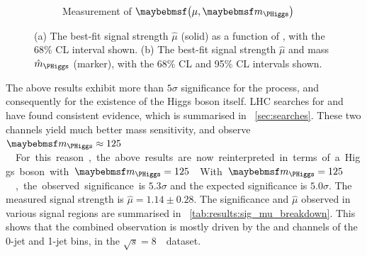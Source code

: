\begin{figure}[t]
\begin{subfigure}[b]{0.495\textwidth}
		\caption{Measurement of $\parenths{\mu, \mH}$}
		\label{fig:results:mu_mH}
	\end{subfigure}
	\caption{(a) The best-fit signal strength $\hat{\mu}$ (solid) as a function of \mH, with 
	the 68\% CL interval shown. (b) The best-fit signal strength $\hat{\mu}$ and mass 
	$\hat{m}_{\PHiggs}$ (marker), with the 68\% CL and 95\% CL intervals shown.}
\end{figure}

The above results exhibit more than $5\sigma$ significance for the \ggHWWlvlv process, and 
consequently for the existence of the Higgs boson itself. LHC searches for 
\HepProcess{\PHiggs \HepTo \Pphoton\Pphoton} and \HepProcess{\PHiggs \HepTo \PZ\PZ} have 
found consistent evidence, which is summarised in \Section~\ref{sec:searches}. These two 
channels yield much better mass sensitivity, and observe \unit{$\mH \approx 125$}{\GeV}. 
For this reason, the above results are now reinterpreted in terms of a Higgs boson with 
\unit{$\mH = 125$}{\GeV}.

With \unit{$\mH = 125$}{\GeV}, the observed significance is $5.3\sigma$ and the expected 
significance is $5.0\sigma$. The measured signal strength is $\hat{\mu} = 1.14 \pm 0.28$. 
The significance and $\hat{\mu}$ observed in various signal regions are summarised in 
\Table~\ref{tab:results:sig_mu_breakdown}. This shows that the combined observation is 
mostly driven by the \emch and \mech channels of the 0-jet and 1-jet bins, in the 
\unit{$\sqrt{s} = 8$}{\TeV} dataset.

